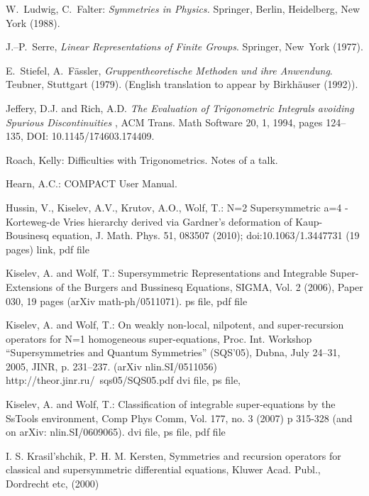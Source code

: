 \begin{thebibliography}{999}
 W.\ Ludwig, C.\ Falter: {\it Symmetries in Physics.}
Springer, Berlin, Heidelberg, New York (1988).

 J.--P.\ Serre, {\it Linear Representations of Finite
Groups}. Springer, New~York (1977).

 E.\  Stiefel, A.\  F{\"a}ssler, {\it Gruppentheoretische
Methoden und ihre Anwendung}. Teubner, Stuttgart (1979).
(English translation to appear by Birkh\"auser (1992)).


 Jeffery, D.J. and Rich, A.D.
\textit{The Evaluation of Trigonometric Integrals avoiding Spurious Discontinuities
}, ACM Trans. Math Software 20, 1, 1994, pages 124--135, DOI: 10.1145/174603.174409.



Roach, Kelly: Difficulties with Trigonometrics. Notes of a talk.

Hearn, A.C.: COMPACT User Manual.


Hussin, V., Kiselev, A.V., Krutov, A.O., Wolf, T.: N=2 Supersymmetric a=4 -
Korteweg-de Vries hierarchy derived via Gardner's deformation of
Kaup-Bousinesq equation, J. Math. Phys. 51, 083507 (2010);
doi:10.1063/1.3447731 (19 pages) link, pdf file

Kiselev, A. and Wolf, T.: Supersymmetric Representations and Integrable
Super-Extensions of the Burgers and Bussinesq Equations, SIGMA, Vol. 2 (2006),
Paper 030, 19 pages (arXiv math-ph/0511071). ps file, pdf file

Kiselev, A. and Wolf, T.: On weakly non-local, nilpotent, and super-recursion
operators for N=1 homogeneous super-equations, Proc. Int. Workshop
``Supersymmetries and Quantum Symmetries'' (SQS'05), Dubna, July 24--31, 2005,
JINR, p. 231--237. (arXiv nlin.SI/0511056)
http://theor.jinr.ru/~sqs05/SQS05.pdf dvi file, ps file,

Kiselev, A. and Wolf, T.: Classification of integrable super-equations by the
SsTools environment, Comp Phys Comm, Vol. 177, no. 3 (2007) p 315-328 (and on
arXiv: nlin.SI/0609065). dvi file, ps file, pdf file

I. S. Krasil'shchik, P. H. M. Kersten, Symmetries and recursion operators for
classical and supersymmetric differential equations, Kluwer Acad. Publ.,
Dordrecht etc, (2000) 


\end{thebibliography}
